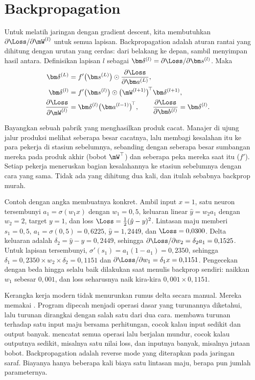 \section{Backpropagation}

Untuk melatih jaringan dengan gradient descent, kita membutuhkan
$\partial\Loss/\partial\mW^{(l)}$ untuk semua lapisan. Backpropagation adalah aturan rantai yang
dihitung dengan urutan yang cerdas: dari belakang ke depan, sambil menyimpan hasil antara.
Definisikan  lapisan $l$ sebagai $\bm\delta^{(l)}=\partial\Loss/\partial\bm s^{(l)}$.
Maka
\begin{align}
\bm\delta^{(L)}&=f'\big(\bm s^{(L)}\big)\odot\frac{\partial\Loss}{\partial\bm a^{(L)}}, \label{eq:deltaL}\\
\bm\delta^{(l)}&=f'\big(\bm s^{(l)}\big)\odot\big(\mW^{(l+1)}\big)^{\!\top}\bm\delta^{(l+1)}, \label{eq:deltal}\\
\frac{\partial\Loss}{\partial\mW^{(l)}}&=\bm\delta^{(l)}\big(\bm a^{(l-1)}\big)^{\!\top},\qquad
\frac{\partial\Loss}{\partial\bm b^{(l)}}=\bm\delta^{(l)}. \label{eq:gradW}
\end{align}

Bayangkan sebuah pabrik yang menghasilkan produk cacat. Manajer di ujung jalur produksi melihat
seberapa besar cacatnya, lalu membagi kesalahan itu ke para pekerja di stasiun sebelumnya,
sebanding dengan seberapa besar sumbangan mereka pada produk akhir (bobot $\mW^\top$) dan
seberapa peka mereka saat itu ($f'$). Setiap pekerja meneruskan bagian kesalahannya ke stasiun
sebelumnya dengan cara yang sama. Tidak ada yang dihitung dua kali, dan itulah sebabnya
backprop murah.

Contoh dengan angka membuatnya konkret. Ambil input $x=1$, satu neuron tersembunyi
$a_1=\sigma(w_1x)$ dengan $w_1=0{,}5$, keluaran linear $\hat y=w_2a_1$ dengan $w_2=2$, target
$y=1$, dan loss $\Loss=\tfrac12(\hat y-y)^2$. Lintasan maju memberi $s_1=0{,}5$,
$a_1=\sigma(0{,}5)=0{,}6225$, $\hat y=1{,}2449$, dan $\Loss=0{,}0300$. Delta keluaran adalah
$\delta_2=\hat y-y=0{,}2449$, sehingga $\partial\Loss/\partial w_2=\delta_2a_1=0{,}1525$. Untuk
lapisan tersembunyi, $\sigma'(s_1)=a_1(1-a_1)=0{,}2350$, sehingga
$\delta_1=0{,}2350\times w_2\times\delta_2=0{,}1151$ dan $\partial\Loss/\partial w_1=\delta_1x=0{,}1151$.
Pengecekan dengan beda hingga selalu baik dilakukan saat menulis backprop sendiri: naikkan $w_1$
sebesar $0{,}001$, dan loss seharusnya naik kira-kira $0{,}001\times0{,}1151$.

Kerangka kerja modern tidak menurunkan rumus delta secara manual. Mereka memakai
 \citep{baydin2018}. Program dipecah menjadi operasi dasar yang
turunannya diketahui, lalu turunan dirangkai dengan salah satu dari dua cara. 
membawa turunan terhadap satu input maju bersama perhitungan, cocok kalau input sedikit dan
output banyak.  mencatat semua operasi lalu berjalan mundur, cocok kalau
outputnya sedikit, misalnya satu nilai loss, dan inputnya banyak, misalnya jutaan bobot.
Backpropagation adalah reverse mode yang diterapkan pada jaringan saraf. Biayanya hanya beberapa
kali biaya satu lintasan maju, berapa pun jumlah parameternya.

